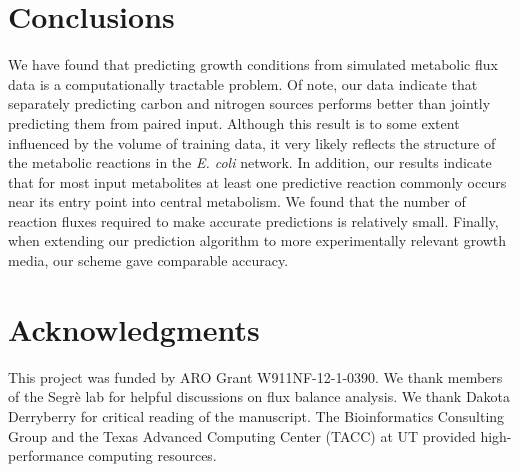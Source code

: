 \documentclass[12pt]{article}
\begin{document}
\section{Conclusions}

We have found that predicting growth conditions from simulated metabolic flux data is a computationally tractable problem. Of note, our data indicate that separately predicting carbon and nitrogen sources performs better than jointly predicting them from paired input. Although this result is to some extent influenced by the volume of training data, it very likely reflects the structure of the metabolic reactions in the \emph{E. coli} network. In addition, our results indicate that for most input metabolites at least one predictive reaction commonly occurs near its entry point into central metabolism. We found that the number of reaction fluxes required to make accurate predictions is relatively small. Finally, when extending our prediction algorithm to more experimentally relevant growth media, our scheme gave comparable accuracy.



\section{Acknowledgments}
This project was funded by ARO Grant W911NF-12-1-0390. We thank members of the Segr\`e lab for helpful discussions on flux balance analysis. We thank Dakota Derryberry for critical reading of the manuscript. The Bioinformatics Consulting Group and the Texas Advanced Computing Center (TACC) at UT provided high-performance computing resources. 



\end{document}
